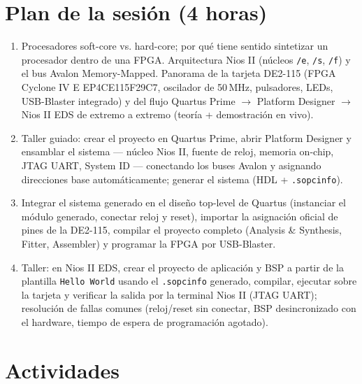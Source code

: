 \documentclass[11pt,letterpaper]{article}
\begin{document}
\section{Plan de la sesión (4 horas)}

\begin{enumerate}[leftmargin=1.2cm]
  \item[\textbf{Hora 1.}] Procesadores soft-core vs. hard-core; por qué tiene sentido sintetizar un
        procesador dentro de una FPGA. Arquitectura Nios II (núcleos \texttt{/e}, \texttt{/s},
        \texttt{/f}) y el bus Avalon Memory-Mapped. Panorama de la tarjeta DE2-115 (FPGA Cyclone IV
        E EP4CE115F29C7, oscilador de 50\,MHz, pulsadores, LEDs, USB-Blaster integrado) y del flujo
        Quartus Prime $\to$ Platform Designer $\to$ Nios II EDS de extremo a extremo (teoría +
        demostración en vivo).
  \item[\textbf{Hora 2.}] Taller guiado: crear el proyecto en Quartus Prime, abrir Platform
        Designer y ensamblar el sistema --- núcleo Nios II, fuente de reloj, memoria on-chip, JTAG
        UART, System ID --- conectando los buses Avalon y asignando direcciones base
        automáticamente; generar el sistema (HDL + \texttt{.sopcinfo}).
  \item[\textbf{Hora 3.}] Integrar el sistema generado en el diseño top-level de Quartus (instanciar
        el módulo generado, conectar reloj y reset), importar la asignación oficial de pines de la
        DE2-115, compilar el proyecto completo (Analysis \& Synthesis, Fitter, Assembler) y
        programar la FPGA por USB-Blaster.
  \item[\textbf{Hora 4.}] Taller: en Nios II EDS, crear el proyecto de aplicación y BSP a partir de
        la plantilla \texttt{Hello World} usando el \texttt{.sopcinfo} generado, compilar, ejecutar
        sobre la tarjeta y verificar la salida por la terminal Nios II (JTAG UART); resolución de
        fallas comunes (reloj/reset sin conectar, BSP desincronizado con el hardware, tiempo de
        espera de programación agotado).
\end{enumerate}

\section{Actividades}
\end{document}
